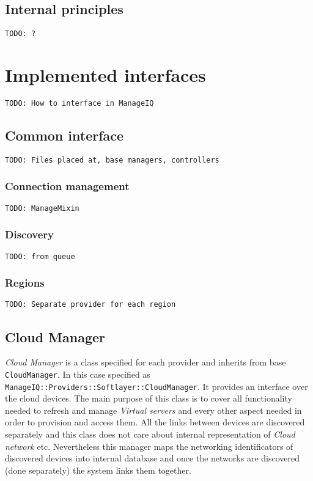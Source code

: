 \section{Internal principles}
\label{sec:Internal principles}


\noindent\texttt{\color{OliveGreen}TODO: ?}

\chapter{Implemented interfaces}
\label{chap:Implemented interfaces}

\noindent\texttt{\color{OliveGreen}TODO: How to interface in ManageIQ}

\section{Common interface}
\label{sec:Common interface}

\noindent\texttt{\color{OliveGreen}TODO: Files placed at, base managers, controllers}

\subsection{Connection management}
\label{sub:Connection management}

\noindent\texttt{\color{OliveGreen}TODO: ManageMixin}

\subsection{Discovery}
\label{sub:Discovery}


\noindent\texttt{\color{OliveGreen}TODO: from queue}

\subsection{Regions}
\label{sub:Regions}

\noindent\texttt{\color{OliveGreen}TODO: Separate provider for each region}

\clearpage
\section{Cloud Manager}
\label{sec:Cloud Manager}

\emph{Cloud Manager} is a class specified for each provider and inherits from base \texttt{CloudManager}. In this case specified as \texttt{ManageIQ::Providers::Softlayer::CloudManager}. It provides an interface over the cloud devices. The main purpose of this class is to cover all functionality needed to refresh and manage \emph{Virtual servers} and every other aspect needed in order to provision and access them. All the links between devices are discovered separately and this class does not care about internal representation of \emph{Cloud network} etc. Nevertheless this manager maps the networking identificators of discovered devices into internal database and once the networks are discovered (done separately) the system links them together.

